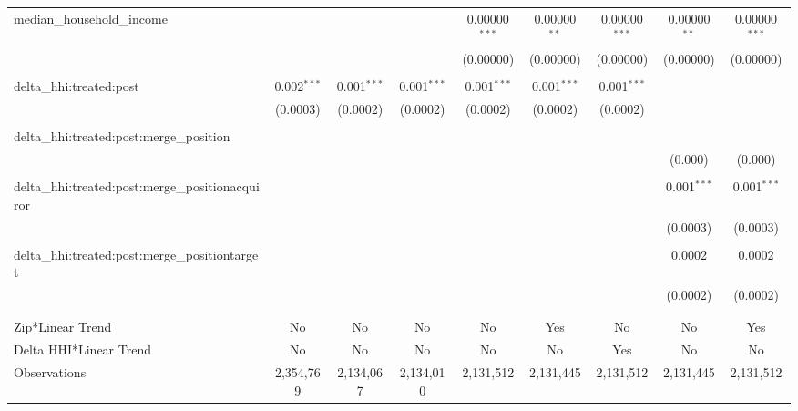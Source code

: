 \begin{table}[H]
{\begin{tabular}{@{\extracolsep{5pt}}lcccccccc}
  median\_household\_income &  &  &  & 0.00000$^{***}$ & 0.00000$^{**}$ & 0.00000$^{***}$ & 0.00000$^{**}$ & 0.00000$^{***}$ \\  

   &  &  &  & (0.00000) & (0.00000) & (0.00000) & (0.00000) & (0.00000) \\  

   & & & & & & & & \\  

  delta\_hhi:treated:post & 0.002$^{***}$ & 0.001$^{***}$ & 0.001$^{***}$ & 0.001$^{***}$ & 0.001$^{***}$ & 0.001$^{***}$ &  &  \\  

   & (0.0003) & (0.0002) & (0.0002) & (0.0002) & (0.0002) & (0.0002) &  &  \\  

   & & & & & & & & \\  

  delta\_hhi:treated:post:merge\_position &  &  &  &  &  &  &  &  \\  

   &  &  &  &  &  &  & (0.000) & (0.000) \\  

   & & & & & & & & \\  

  delta\_hhi:treated:post:merge\_positionacquiror &  &  &  &  &  &  & 0.001$^{***}$ & 0.001$^{***}$ \\  

   &  &  &  &  &  &  & (0.0003) & (0.0003) \\  

   & & & & & & & & \\  

  delta\_hhi:treated:post:merge\_positiontarget &  &  &  &  &  &  & 0.0002 & 0.0002 \\  

   &  &  &  &  &  &  & (0.0002) & (0.0002) \\  

   & & & & & & & & \\  

 \hline \\[-1.8ex]  

 Zip*Linear Trend & No & No & No & No & Yes & No & No & Yes \\  

 Delta HHI*Linear Trend & No & No & No & No & No & Yes & No & No \\  

 Observations & 2,354,769 & 2,134,067 & 2,134,010 & 2,131,512 & 2,131,445 & 2,131,512 & 2,131,445 & 2,131,512 \\  


\end{tabular}}
\end{table}
